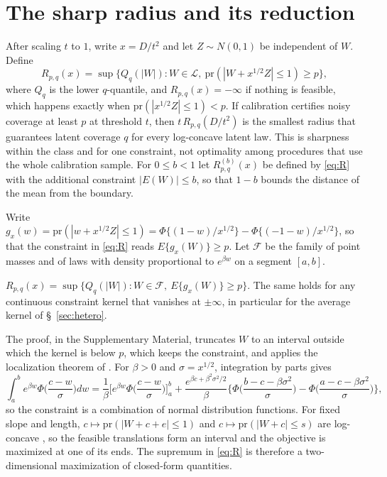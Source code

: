 \documentclass[lineno]{biometrika}
\newcommand{\pr}{\mathrm{pr}}
\newcommand{\LC}{\mathcal{L}}
\begin{document}
\section{The sharp radius and its reduction}\label{sec:setup}

After scaling $t$ to $1$, write $x = D/t^2$ and let $Z \sim N(0,1)$ be independent of $W$. Define
\begin{equation}\label{eq:R}
R_{p,q}(x) = \sup\{ Q_q(|W|) : W \in \LC,\ \pr(|W + x^{1/2}Z| \le 1) \ge p \},
\end{equation}
where $Q_q$ is the lower $q$-quantile, and $R_{p,q}(x) = -\infty$ if nothing is feasible, which happens exactly when $\pr(|x^{1/2}Z| \le 1) < p$. If calibration certifies noisy coverage at least $p$ at threshold $t$, then $t\,R_{p,q}(D/t^2)$ is the smallest radius that guarantees latent coverage $q$ for every log-concave latent law. This is sharpness within the class and for one constraint, not optimality among procedures that use the whole calibration sample. For $0 \le b < 1$ let $R^{(b)}_{p,q}(x)$ be defined by \eqref{eq:R} with the additional constraint $|E(W)| \le b$, so that $1 - b$ bounds the distance of the mean from the boundary.

Write $g_x(w) = \pr(|w + x^{1/2}Z| \le 1) = \Phi\{(1-w)/x^{1/2}\} - \Phi\{(-1-w)/x^{1/2}\}$, so that the constraint in \eqref{eq:R} reads $E\{g_x(W)\} \ge p$. Let $\mathcal F$ be the family of point masses and of laws with density proportional to $e^{\beta w}$ on a segment $[a,b]$.

\begin{proposition}\label{prop:reduction}
$R_{p,q}(x) = \sup\{Q_q(|W|) : W \in \mathcal F,\ E\{g_x(W)\} \ge p\}$. The same holds for any continuous constraint kernel that vanishes at $\pm\infty$, in particular for the average kernel of \S~\ref{sec:hetero}.
\end{proposition}

The proof, in the Supplementary Material, truncates $W$ to an interval outside which the kernel is below $p$, which keeps the constraint, and applies the localization theorem of \citet{fradelizi2004}. For $\beta > 0$ and $\sigma = x^{1/2}$, integration by parts gives
\begin{equation}\label{eq:closed}
\int_a^b e^{\beta w}\Phi\Big(\frac{c-w}{\sigma}\Big)dw = \frac{1}{\beta}\Big[e^{\beta w}\Phi\Big(\frac{c-w}{\sigma}\Big)\Big]_a^b + \frac{e^{\beta c + \beta^2\sigma^2/2}}{\beta}\Big\{\Phi\Big(\frac{b-c-\beta\sigma^2}{\sigma}\Big) - \Phi\Big(\frac{a-c-\beta\sigma^2}{\sigma}\Big)\Big\},
\end{equation}
so the constraint is a combination of normal distribution functions. For fixed slope and length, $c \mapsto \pr(|W + c + e| \le 1)$ and $c \mapsto \pr(|W + c| \le s)$ are log-concave \citep{prekopa1973}, so the feasible translations form an interval and the objective is maximized at one of its ends. The supremum in \eqref{eq:R} is therefore a two-dimensional maximization of closed-form quantities.
\end{document}

